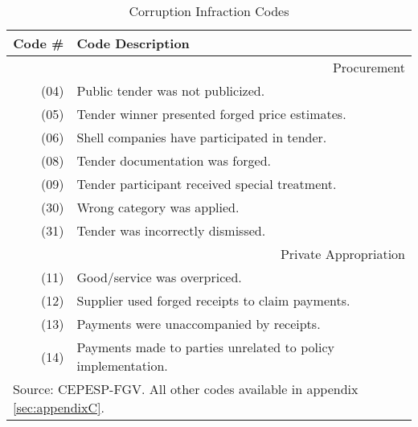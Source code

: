 
\begin{table}[!htbp]
  \caption{\label{tab:corruptioncodes} Corruption Infraction Codes}
  \centering
  \scriptsize
  \begin{tabular}{r|l}
  \hline

  \hline
  Code \# & Code Description                                          \T \B \\
  \hline
  \multicolumn{2}{r}{Procurement}                                     \T \B \\
  \hline
  (04) & Public tender was not publicized.                            \T \B \\
  (05) & Tender winner presented forged price estimates.              \T \B \\
  (06) & Shell companies have participated in tender.                 \T \B \\
  (08) & Tender documentation was forged.                             \T \B \\
  (09) & Tender participant received special treatment.               \T \B \\
  (30) & Wrong category was applied.                                  \T \B \\
  (31) & Tender was incorrectly dismissed.                            \T \B \\
  \hline
  \multicolumn{2}{r}{Private Appropriation}                           \T \B \\
  \hline
  (11) & Good/service was overpriced.                                 \T \B \\
  (12) & Supplier used forged receipts to claim payments.      \T \B \\
  (13) & Payments were unaccompanied by receipts.                     \T \B \\
  (14) & Payments made to parties unrelated to policy implementation. \T \B \\
  \hline

  \hline
  \multicolumn{2}{l}{\footnotesize Source: CEPESP-FGV. All other codes available in appendix \ref{sec:appendixC}.} \T
  \end{tabular}
\end{table}